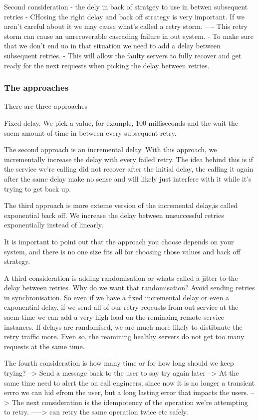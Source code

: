 \documentclass[a4paper, 11pt]{book}
\begin{document}
    Second consideration
    - the dely in back of stratgey to use in betwen subsequent retries
    - CHosing the right delay and back off strategy is very important.
    If we aren't careful about it we may cause what's called a retry storm.
    ---- This retry storm can cause an unrecoverable cascading failure in out system.
    - To make sure that we don't end uo in that situation we need to add a delay between subsequent retries.
    - This will allow the faulty servers to fully recover and get ready for the next requests when picking the delay between retries.

    \subsubsection{The approaches}
    There are three approaches

    Fixed delay. We pick a value, for example, 100 milliseconds and the wait the saem amount of time in between every subsequent retry.

    The second approach is an incremental delay.
    With this approach, we incrementally increase the delay with every failed retry.
    The idea behind this is if the service we're calling did not recover after the initial delay, the calling it again after the same delay make no sense and will likely just interfere with it while it's trying to get back up.

    The third approach is more exteme version of the incremental delay,is called exponential back off.
    We increase the delay between unsuccessful retries exponentially instead of linearly.

    It is important to point out that the approach you choose depends on your system, and there is no one size fits all for choosing those values and back off strategy.

    A third consideration is adding randomisation or whats called a jitter to the delay between retries.
    Why do we want that randomisation?
    Avoid sending retries in synchronisation.
    So even if we have a fixed incremental delay or even a exponential delay, if we send all of our retry reqeusts from out service at the saem time we can add a very high load on the reminaing remote service instances.
    If delays are randomised, we are much more likely to distibnute the retry traffic more.
    Even so, the reamining healthy servers do not get too many requests at the same time.

    The fourth consideration is how many time or for how long should we keep trying?
    --> Send a message back to the user to say try again later
    -->  At the same time need to alert the on call engineers, since now it is no longer a transient errro we can hid efrom the user, but a long lasting error that impacts the users.
    --> The next consideration is the idempotency of the operation we're attempting to retry.
    -----> can retry the same operation twice etc safely.
\end{document}
